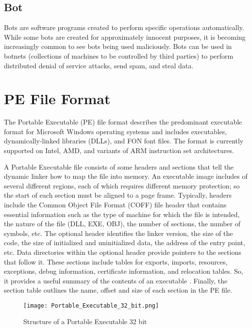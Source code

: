 \subsection{Bot}

Bots are software programs created to perform specific operations automatically. While some bots are created for approximately innocent purposes, it is becoming increasingly common to see bots being used maliciously. Bots can be used in botnets (collections of machines to be controlled by third parties) to perform distributed denial of service attacks, send spam, and steal data.

\section{PE File Format}
\label{sec:pe-file}

The Portable Executable (PE) file format describes the predominant executable format for Microsoft Windows operating systems and includes executables, dynamically-linked libraries (DLLs), and FON font files. The format is currently supported on Intel, AMD, and variants of ARM instruction set architectures.

A Portable Executable file consists of some headers and sections that tell the dynamic linker how to map the file into memory. An executable image includes of several different regions, each of which requires different memory protection; so the start of each section must be aligned to a page frame. Typically, headers include the Common Object File Format (COFF) file header that contains essential information such as the type of machine for which the file is intended, the nature of the file (DLL, EXE, OBJ), the number of sections, the number of symbols, etc. The optional header identifies the linker version, the size of the code, the size of initialized and uninitialized data, the address of the entry point, etc. Data directories within the optional header provide pointers to the sections that follow it. These sections include tables for exports, imports, resources, exceptions, debug information, certificate information, and relocation tables. So, it provides a useful summary of the contents of an executable \cite{shafiq2009pe}. Finally, the section table outlines the name, offset and size of each section in the PE file.

\begin{figure}[H] 
\centering    
\texttt{[image: Portable\_Executable\_32\_bit.png]}
\caption{Structure of a Portable Executable 32 bit \cite{wikipefile}}
\label{fig:pe32bit}
\end{figure}

